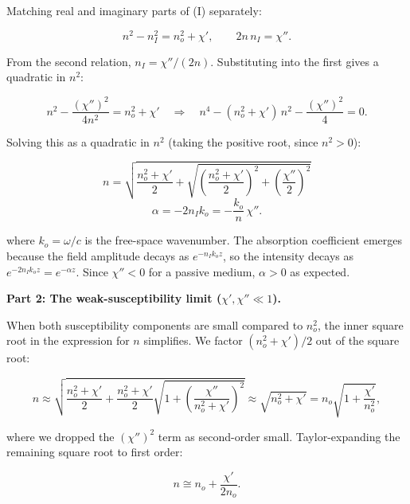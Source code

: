 Matching real and imaginary parts of \textup{(I)} separately:

\begin{equation*}
  n^2 - n_I^2 = n_o^2 + \chi', \qquad 2n\,n_I = \chi''.
\end{equation*}

From the second relation, $n_I = \chi''/(2n)$. Substituting into the first gives a quadratic in $n^2$:

\begin{equation*}
  n^2 - \frac{(\chi'')^2}{4n^2} = n_o^2 + \chi'
  \quad\Longrightarrow\quad
  n^4 - (n_o^2+\chi')\,n^2 - \frac{(\chi'')^2}{4} = 0.
\end{equation*}

Solving this as a quadratic in $n^2$ (taking the positive root, since $n^2 > 0$):

\begin{equation*}
  \boxed{n = \sqrt{\frac{n_o^2+\chi'}{2} + \sqrt{\!\left(\frac{n_o^2+\chi'}{2}\right)^{\!2}+\left(\frac{\chi''}{2}\right)^{\!2}}}}
\end{equation*}
\begin{equation*}
  \boxed{\alpha = -2n_I k_o = -\frac{k_o}{n}\,\chi''.}
\end{equation*}

where $k_o = \omega/c$ is the free-space wavenumber. The absorption coefficient emerges because the field amplitude decays as $e^{-n_I k_o z}$, so the intensity decays as $e^{-2n_I k_o z} = e^{-\alpha z}$. Since $\chi'' < 0$ for a passive medium, $\alpha > 0$ as expected.

\textbf{Part 2: The weak-susceptibility limit ($\chi', \chi'' \ll 1$).}

When both susceptibility components are small compared to $n_o^2$, the inner square root in the expression for $n$ simplifies. We factor $(n_o^2 + \chi')/2$ out of the square root:

\begin{equation*}
  n \approx \sqrt{\frac{n_o^2+\chi'}{2} + \frac{n_o^2+\chi'}{2}
  \sqrt{1+\left(\frac{\chi''}{n_o^2+\chi'}\right)^{\!2}}}
  \approx \sqrt{n_o^2 + \chi'} = n_o\sqrt{1 + \frac{\chi'}{n_o^2}},
\end{equation*}

where we dropped the $(\chi'')^2$ term as second-order small. Taylor-expanding the remaining square root to first order:

\begin{equation*}
  \boxed{n \cong n_o + \frac{\chi'}{2n_o}.}
\end{equation*}

